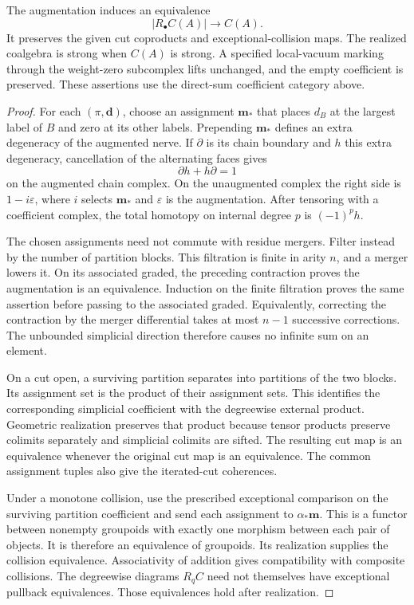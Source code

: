 \begin{theorem}
\label{thm:vacuum-reassembly}
The augmentation induces an equivalence
\[
 |R_\bullet C(A)|\longrightarrow C(A).
\]
It preserves the given cut coproducts and exceptional-collision
maps.  The realized coalgebra is strong when \(C(A)\) is strong.
A specified local-vacuum marking through the weight-zero
subcomplex lifts unchanged, and the empty coefficient is preserved.
These assertions use the direct-sum coefficient category above.
\end{theorem}
\begin{proof}
For each \((\pi,\mathbf d)\), choose an assignment \(\mathbf m_*\)
that places \(d_B\) at the largest label of \(B\) and zero at its
other labels.  Prepending \(\mathbf m_*\) defines an extra
degeneracy of the augmented nerve.  If \(\partial\) is its chain
boundary and \(h\) this extra degeneracy, cancellation of the
alternating faces gives
\[
 \partial h+h\partial=1
\]
on the augmented chain complex.  On the unaugmented complex the
right side is \(1-i\varepsilon\), where \(i\) selects
\(\mathbf m_*\) and \(\varepsilon\) is the augmentation.
After tensoring with a coefficient complex, the total homotopy
on internal degree \(p\) is \((-1)^ph\).

The chosen assignments need not commute with residue mergers.
Filter instead by the number of partition blocks.  This
filtration is finite in arity \(n\), and a merger lowers it.
On its associated graded, the preceding contraction proves the
augmentation is an equivalence.  Induction on the finite
filtration proves the same assertion before passing to the
associated graded.  Equivalently, correcting the contraction by
the merger differential takes at most \(n-1\) successive
corrections.  The unbounded simplicial direction therefore causes
no infinite sum on an element.

On a cut open, a surviving partition separates into partitions of
the two blocks.  Its assignment set is the product of their
assignment sets.  This identifies the corresponding simplicial
coefficient with the degreewise external product.  Geometric
realization preserves that product because tensor products
preserve colimits separately and simplicial colimits are sifted.
The resulting cut map is an equivalence whenever the original
cut map is an equivalence.  The common assignment tuples also
give the iterated-cut coherences.

Under a monotone collision, use the prescribed exceptional
comparison on the surviving partition coefficient and send each
assignment to \(\alpha_*\mathbf m\).  This is a functor between
nonempty groupoids with exactly one morphism between each pair
of objects.  It is therefore an equivalence of groupoids.  Its
realization supplies the collision equivalence.  Associativity
of addition gives compatibility with composite collisions.
The degreewise diagrams \(R_qC\) need not themselves have
exceptional pullback equivalences.  Those equivalences hold
after realization.


\end{proof}
